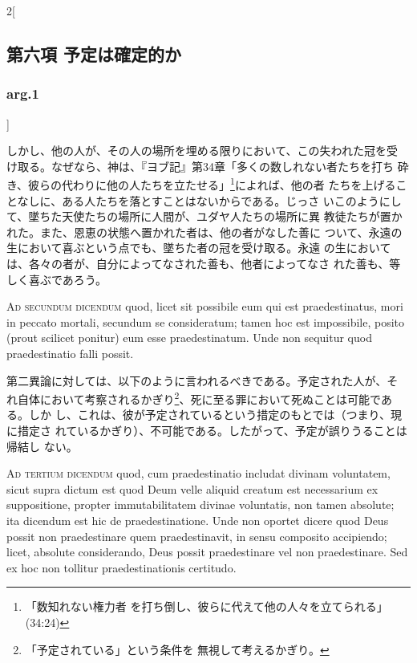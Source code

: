 \documentclass[paper=a4paper,fontsize=10pt,jafontsize=9pt,titlepage]{jlreq}
\begin{document}
\begin{paracol}{2}[\subsection{第六項 予定は確定的か}\subsubsection{arg.1}]
\switchcolumn


しかし、他の人が、その人の場所を埋める限りにおいて、この失われた冠を受
け取る。なぜなら、神は、『ヨブ記』第34章「多くの数しれない者たちを打ち
砕き、彼らの代わりに他の人たちを立たせる」\footnote{「数知れない権力者
を打ち倒し、彼らに代えて他の人々を立てられる」(34:24)}によれば、他の者
たちを上げることなしに、ある人たちを落とすことはないからである。じっさ
いこのようにして、墜ちた天使たちの場所に人間が、ユダヤ人たちの場所に異
教徒たちが置かれた。また、恩恵の状態へ置かれた者は、他の者がなした善に
ついて、永遠の生において喜ぶという点でも、墜ちた者の冠を受け取る。永遠
の生においては、各々の者が、自分によってなされた善も、他者によってなさ
れた善も、等しく喜ぶであろう。


\switchcolumn*[\subsubsection{ad.2}]


{\scshape Ad secundum dicendum} quod, licet sit
possibile eum qui est praedestinatus, mori in peccato mortali, secundum
se consideratum; tamen hoc est impossibile, posito (prout scilicet
ponitur) eum esse praedestinatum. Unde non sequitur quod praedestinatio
falli possit.


\switchcolumn


第二異論に対しては、以下のように言われるべきである。予定された人が、そ
れ自体において考察されるかぎり\footnote{「予定されている」という条件を
無視して考えるかぎり。}、死に至る罪において死ぬことは可能である。しか
し、これは、彼が予定されているという措定のもとでは（つまり、現に措定さ
れているかぎり）、不可能である。したがって、予定が誤りうることは帰結し
ない。


\switchcolumn*[\subsubsection{ad.3}]


{\scshape Ad tertium dicendum} quod, cum praedestinatio
includat divinam voluntatem, sicut supra dictum est quod Deum velle
aliquid creatum est necessarium ex suppositione, propter immutabilitatem
divinae voluntatis, non tamen absolute; ita dicendum est hic de
praedestinatione. Unde non oportet dicere quod Deus possit non
praedestinare quem praedestinavit, in sensu composito accipiendo; licet,
absolute considerando, Deus possit praedestinare vel non
praedestinare. Sed ex hoc non tollitur praedestinationis certitudo.


\switchcolumn



\end{paracol}
\end{document}
